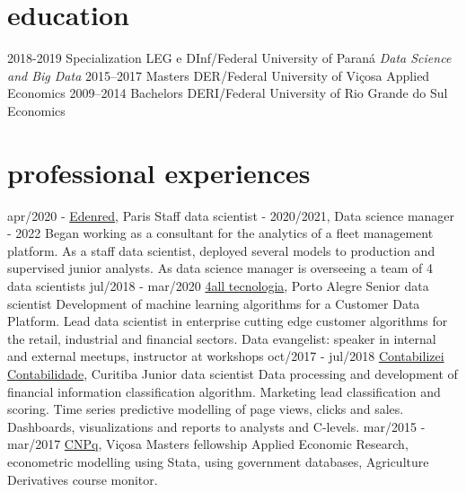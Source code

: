 \documentclass[]{friggeri-cv}
\begin{document}
\section{education}

\begin{entrylist}
  \entry
    {2018-2019}
    {Specialization}
    {LEG e DInf/Federal University of Paraná}
    {\emph{Data Science and Big Data}}
  \entry
    {2015–2017}
    {Masters}
    {DER/Federal University of Viçosa}
    {Applied Economics}
  \entry
    {2009–2014}
    {Bachelors}
    {DERI/Federal University of Rio Grande do Sul}
    {Economics}
\end{entrylist}

\section{professional experiences}

\begin{entrylist}
  \entry
    {apr/2020 - }
    {\href{https://www.edenred.com}{Edenred}, Paris}
    {Staff data scientist - 2020/2021, Data science manager - 2022}
    {Began working as a consultant for the analytics of a fleet management platform.
    As a staff data scientist, deployed several models to production and supervised junior analysts.
    As data science manager is overseeing a team of 4 data scientists}
  \entry
    {jul/2018 - mar/2020}
    {\href{https://www.4all.com/}{4all tecnologia}, Porto Alegre}
    {Senior data scientist}
    {Development of machine learning algorithms for a Customer Data Platform.
    Lead data scientist in enterprise cutting edge customer algorithms for the retail, industrial and financial sectors.
    Data evangelist: speaker in internal and external meetups, instructor at workshops}
  \entry
    {oct/2017 - jul/2018}
    {\href{https://www.contabilizei.com.br}{Contabilizei Contabilidade}, Curitiba}
    {Junior data scientist}
    {Data processing and development of financial information classification algorithm.
    Marketing lead classification and scoring.
    Time series predictive modelling of page views, clicks and sales.
    Dashboards, visualizations and reports to analysts and C-levels.}
  \entry
    {mar/2015 - mar/2017}
    {\href{cnpq.br}{CNPq}, Viçosa}
    {Masters fellowship}
    {Applied Economic Research, econometric modelling using Stata, using government databases, Agriculture Derivatives course monitor.}
\end{entrylist}
\end{document}

